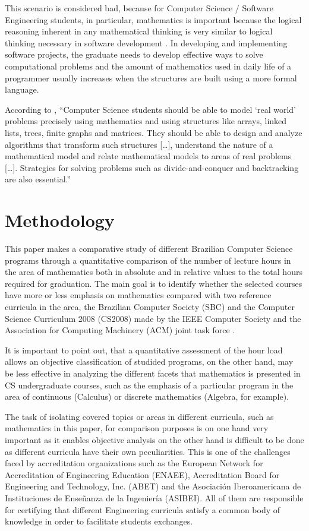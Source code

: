 \documentclass[conference]{IEEEtran}
\begin{document}
	This scenario is considered bad, because for Computer Science / Software Engineering students, in particular, mathematics is important because the logical reasoning inherent in any mathematical thinking is very similar to logical thinking necessary in software development \cite{ralston:do_need_mathematics}. In developing and implementing software projects, the graduate needs to develop effective ways to solve computational problems and the amount of mathematics used in daily life of a programmer usually increases when the structures are built using a more formal language. \cite{ralston:do_need_mathematics}

	According to \cite{kelemen:has_become_math_phobic}, ``Computer Science students should be able to model `real world' problems precisely using mathematics and using structures like arrays, linked lists, trees, finite graphs and matrices. They should be able to design and analyze algorithms that transform such structures [\ldots], understand the nature of a mathematical model and relate mathematical models to areas of real problems [\ldots]. Strategies for solving problems such as divide-and-conquer and backtracking are also essential.''

\section{Methodology}
	This paper makes a comparative study of different Brazilian Computer Science programs through a quantitative comparison of the number of lecture hours in the area of mathematics both in absolute and in relative values to the total hours required for graduation. The main goal is to identify whether the selected courses have more or less emphasis on mathematics compared with two reference curricula in the area, the Brazilian Computer Society (SBC) \cite{sbc} and the Computer Science Curriculum 2008 (CS2008) made by the IEEE Computer Society and the Association for Computing Machinery (ACM) joint task force \cite{cs2008}.

	It is important to point out, that a quantitative assessment of the hour load allows an objective classification of studided programs, on the other hand, may be less effective in analyzing the different facets that mathematics is presented in CS undergraduate courses, such as the emphasis of a particular program in the area of continuous (Calculus) or discrete mathematics (Algebra, for example).

	The task of isolating covered topics or areas in different curricula, such as mathematics in this paper, for comparison purposes is on one hand very important as it enables objective analysis on the other hand is difficult to be done as different curricula have their own peculiarities. This is one of the challenges faced by accreditation organizations such as the European Network for Accreditation of Engineering Education (ENAEE), Accreditation Board for Engineering and Technology, Inc. (ABET) and the Asociación Iberoamericana de Instituciones de Enseñanza de la Ingeniería (ASIBEI). All of them are responsible for certifying that different Engineering curricula satisfy a common body of knowledge in order to facilitate students exchanges.
	
\end{document}
